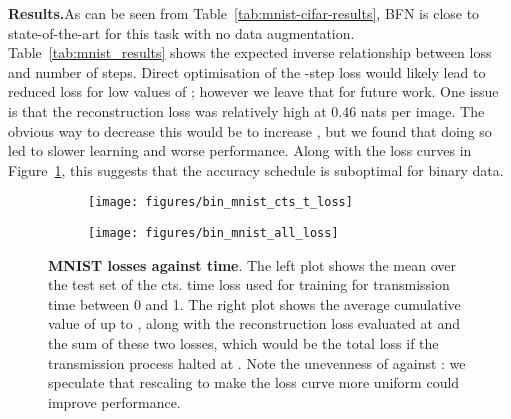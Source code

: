 \documentclass[11pt,table]{article}
\newcommand{\0}[1]{\constvec{0}{#1}}
\newcommand{\1}[1]{\constvec{1}{#1}}
\begin{document}
\noindent\textbf{Results.}\quad As can be seen from Table~\ref{tab:mnist-cifar-results}, BFN is close to state-of-the-art for this task with no data augmentation. 
Table~\ref{tab:mnist_results} shows the expected inverse relationship between loss and number of steps.
Direct optimisation of the -step loss would likely lead to reduced loss for low values of ; however we leave that for future work.
One issue is that the reconstruction loss was relatively high at 0.46 nats per image. 
The obvious way to decrease this would be to increase , but we found that doing so led to slower learning and worse performance.
Along with the loss curves in Figure~\ref{fig:bin_mnist_loss}, this suggests that the accuracy schedule is suboptimal for binary data.

\begin{figure}[t!]
\centering
\begin{subfigure}{.49\textwidth}
  \centering
  \texttt{[image: figures/bin\_mnist\_cts\_t\_loss]}
\end{subfigure}
\begin{subfigure}{.49\textwidth}
  \centering
  \texttt{[image: figures/bin\_mnist\_all\_loss]}
\end{subfigure}
\caption{\textbf{MNIST losses against time}. The left plot shows the mean over the test set of the cts. time loss  used for training for transmission time  between 0 and 1. The right plot shows the average cumulative value of  up to , along with the reconstruction loss  evaluated at  and the sum of these two losses, which would be the total loss if the transmission process halted at .
Note the unevenness of  against : we speculate that rescaling  to make the loss curve more uniform could improve performance.}
\label{fig:bin_mnist_loss}
\end{figure}
\end{document}

